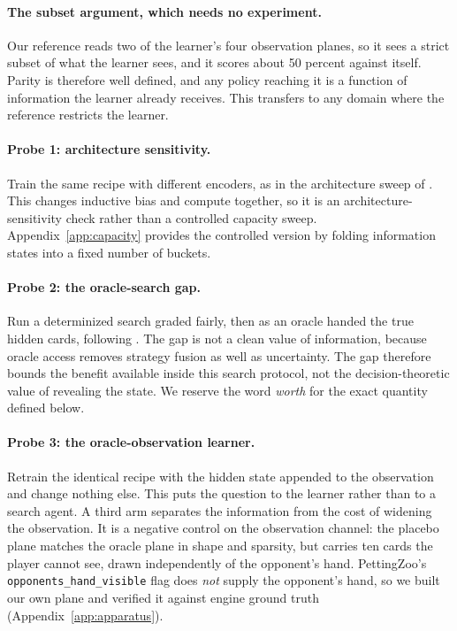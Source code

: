 \documentclass{article}
\begin{document}
\paragraph{The subset argument, which needs no experiment.} Our reference reads two of the learner's four observation planes, so it sees a strict subset of what the learner sees, and it scores about 50 percent against itself. Parity is therefore well defined, and any policy reaching it is a function of information the learner already receives. This transfers to any domain where the reference restricts the learner.

\paragraph{Probe 1: architecture sensitivity.} Train the same recipe with different encoders, as in the architecture sweep of \citet{goldstandard}. This changes inductive bias and compute together, so it is an architecture-sensitivity check rather than a controlled capacity sweep. Appendix~\ref{app:capacity} provides the controlled version by folding information states into a fixed number of buckets.

\paragraph{Probe 2: the oracle-search gap.} Run a determinized search \citep{pimc,ismcts} graded fairly, then as an oracle handed the true hidden cards, following \citet{goldstandard}. The gap is not a clean value of information, because oracle access removes strategy fusion \citep{strategyfusion,rebel} as well as uncertainty. The gap therefore bounds the benefit available inside this search protocol, not the decision-theoretic value of revealing the state. We reserve the word \emph{worth} for the exact quantity defined below.

\paragraph{Probe 3: the oracle-observation learner.} Retrain the identical recipe with the hidden state appended to the observation and change nothing else. This puts the question to the learner rather than to a search agent. A third arm separates the information from the cost of widening the observation. It is a negative control on the observation channel: the placebo plane matches the oracle plane in shape and sparsity, but carries ten cards the player cannot see, drawn independently of the opponent's hand. PettingZoo's \texttt{opponents\_hand\_visible} flag does \emph{not} supply the opponent's hand, so we built our own plane and verified it against engine ground truth (Appendix~\ref{app:apparatus}).
\end{document}
